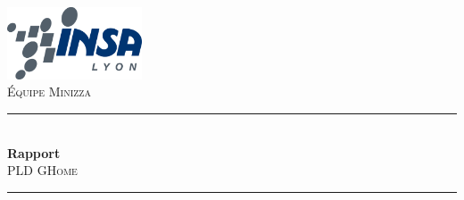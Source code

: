 \documentclass[a4paper]{report}
\title{\leTitre}
\author{H4111}
\newcommand{\leTitre}{Rapport}
\begin{document}
\begin{titlepage}



\newcommand{\HRule}{\rule{\linewidth}{0.5mm}} %

\center %


\includegraphics [width=40mm]{image/logo_INSA.png} \\[1.5cm]


\textsc{\large Équipe Minizza}\\[0.5cm] %





\HRule \\[0.4cm]
{ \huge \bfseries \leTitre}\\[0.4cm] %
\textsc{\Large PLD GHome}\\[0.5cm] %
\HRule \\[1.5cm]
 


\end{titlepage}
\end{document}
